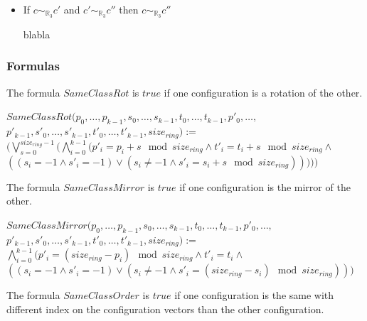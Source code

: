 \documentclass{article}
\begin{document}
\begin{itemize}
\begin{itemize}
        \item \begin{center} If $c\sim_{\mathbb{R}_{3}}c'$ and $c'\sim_{\mathbb{R}_{3}}c''$ then $c\sim_{\mathbb{R}_{3}}c''$\end{center}
        blabla
    
    \end{itemize}
\end{itemize}

\subsubsection{Formulas}

\noindent The formula $SameClassRot$ is $true$ if one configuration is a rotation of the other.

\begin{center}
    
$SameClassRot (p_{0}, \dots, p_{k-1}, s_{0}, \dots, s_{k-1}, t_{0}, \dots, t_{k-1}, p'_{0}, \dots,$\\
$p'_{k-1}, s'_{0}, \dots, s'_{k-1}, t'_{0}, \dots, t'_{k-1}, size_{ring}):=$\\
$ (\bigvee_{s=0}^{size_{ring}-1}  ( \bigwedge_{i=0}^{k-1}  (p'_{i} = p_{i}+s \mod{size_{ring}} \land t'_{i} = t_{i}+s \mod{size_{ring}} \land$\\
$ ( (s_{i} = -1 \land s'_{i} = -1) \lor  (s_{i} \not= -1 \land s'_{i} = s_{i}+s \mod{size_{ring}}) ) ) ))$
\end{center}

\noindent The formula $SameClassMirror$ is $true$ if one configuration is the mirror of the other.

\begin{center}
    
    $SameClassMirror (p_{0}, \dots, p_{k-1}, s_{0}, \dots, s_{k-1}, t_{0}, \dots, t_{k-1}, p'_{0}, \dots,$\\
    $p'_{k-1}, s'_{0}, \dots, s'_{k-1}, t'_{0}, \dots, t'_{k-1}, size_{ring}):=$\\
    $\bigwedge_{i=0}^{k-1} ( p'_{i} =  (size_{ring} - p_{i})\mod{size_{ring}} \land t'_{i} = t_{i} \land$ \\
    $ ( (s_{i} = -1 \land s'_{i} = -1) \lor  (s_{i} \not= -1 \land s'_{i} =  (size_{ring} - s_{i})\mod{size_{ring}}))) $
\end{center}

\noindent The formula $SameClassOrder$ is $true$ if one configuration is the same with different index on the configuration vectors than the other configuration.
\end{document}
